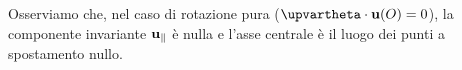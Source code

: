 




Osserviamo che, nel caso di rotazione pura
($\bm{\upvartheta} \cdot \ub(O) = 0$), la componente
invariante $\mathbf{u}_{\parallel}$ è nulla e l'asse centrale è il
luogo dei punti a spostamento nullo.

%




